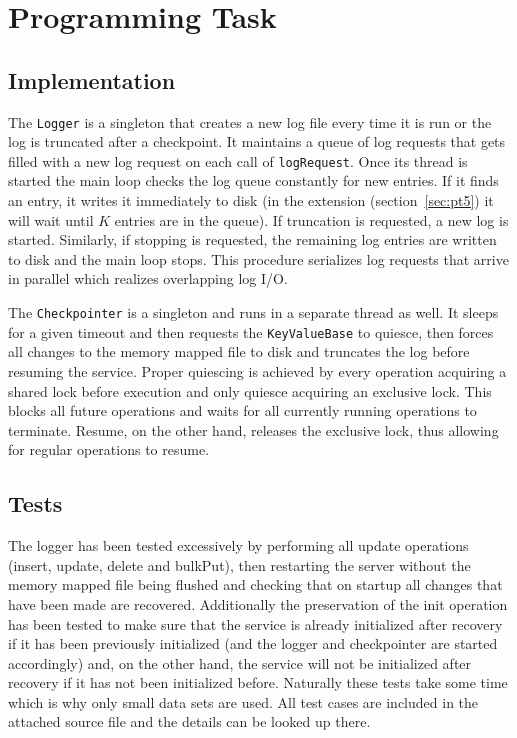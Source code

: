 \documentclass[a4paper,11pt]{article}
\begin{document}
\section{Programming Task}
\label{sec:pt}

\subsection{Implementation}
\label{sec:pt1}
The \texttt{Logger} is a singleton that creates a new log file every time it is run or the log is truncated after a checkpoint. It maintains a queue of log requests that gets filled with a new log request on each call of \texttt{logRequest}. Once its thread is started the main loop checks the log queue constantly for new entries. If it finds an entry, it writes it immediately to disk (in the extension (section~\ref{sec:pt5}) it will wait until \(K\) entries are in the queue). If truncation is requested, a new log is started. Similarly, if stopping is requested, the remaining log entries are written to disk and the main loop stops. This procedure serializes log requests that arrive in parallel which realizes overlapping log I/O.

The \texttt{Checkpointer} is a singleton and runs in a separate thread as well. It sleeps for a given timeout and then requests the \texttt{KeyValueBase} to quiesce, then forces all changes to the memory mapped file to disk and truncates the log before resuming the service. Proper quiescing is achieved by every operation acquiring a shared lock before execution and only quiesce acquiring an exclusive lock. This blocks all future operations and waits for all currently running operations to terminate. Resume, on the other hand, releases the exclusive lock, thus allowing for regular operations to resume.

\subsection{Tests}
\label{sec:pt2}
The logger has been tested excessively by performing all update operations (insert, update, delete and bulkPut), then restarting the server without the memory mapped file being flushed and checking that on startup all changes that have been made are recovered. Additionally the preservation of the init operation has been tested to make sure that the service is already initialized after recovery if it has been previously initialized (and the logger and checkpointer are started accordingly) and, on the other hand, the service will not be initialized after recovery if it has not been initialized before. Naturally these tests take some time which is why only small data sets are used. All test cases are included in the attached source file and the details can be looked up there.
\end{document}
